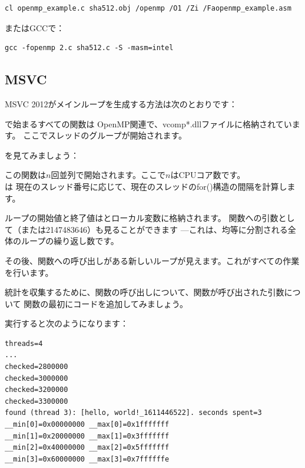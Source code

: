 \begin{lstlisting}
cl openmp_example.c sha512.obj /openmp /O1 /Zi /Faopenmp_example.asm
\end{lstlisting}

またはGCCで：

\begin{lstlisting}
gcc -fopenmp 2.c sha512.c -S -masm=intel
\end{lstlisting}

\subsection{MSVC}

MSVC 2012がメインループを生成する方法は次のとおりです：



で始まるすべての関数は
OpenMP関連で、vcomp*.dllファイルに格納されています。
ここでスレッドのグループが開始されます。

を見てみましょう：



この関数は$n$回並列で開始されます。ここで$n$は\ac{CPU}コア数です。\\
は
現在のスレッド番号に応じて、現在のスレッドのfor()構造の間隔を計算します。

ループの開始値と終了値はとローカル変数に格納されます。
関数への引数として（または2147483646）も見ることができます
---これは、均等に分割される全体のループの繰り返し数です。

その後、関数への呼び出しがある新しいループが見えます。これがすべての作業を行います。

統計を収集するために、関数の呼び出しについて、関数が呼び出された引数について
関数の最初にコードを追加してみましょう。

実行すると次のようになります：

\begin{lstlisting}
threads=4
...
checked=2800000
checked=3000000
checked=3200000
checked=3300000
found (thread 3): [hello, world!_1611446522]. seconds spent=3
__min[0]=0x00000000 __max[0]=0x1fffffff
__min[1]=0x20000000 __max[1]=0x3fffffff
__min[2]=0x40000000 __max[2]=0x5fffffff
__min[3]=0x60000000 __max[3]=0x7ffffffe
\end{lstlisting}

